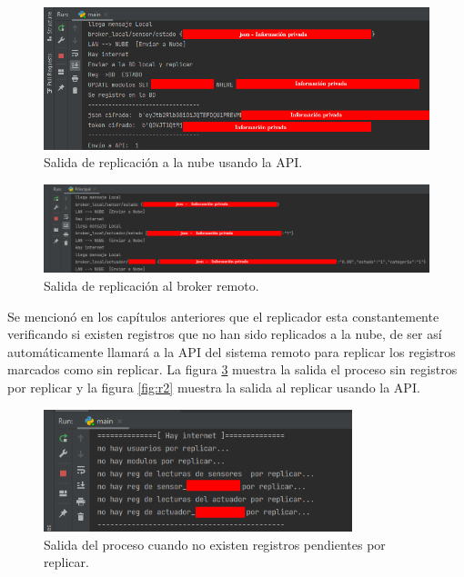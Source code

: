 \begin{figure}[htpb]
\centering 
\includegraphics[width=1.0\textwidth]{./Figures/test/replicador/enviaAPI.png}
\caption{Salida de replicación a la nube usando la API.}
\label{fig:envia1}
\end{figure}

\begin{figure}[htpb]
\centering 
\includegraphics[width=1.0\textwidth]{./Figures/test/replicador/enviabroker.png}
\caption{Salida de replicación al broker remoto.}
\label{fig:envia2}
\end{figure}

Se mencionó en los capítulos anteriores que el replicador esta constantemente verificando si existen registros que no han sido replicados a la nube, de ser así automáticamente llamará a la API del sistema remoto para replicar los registros marcados como sin replicar. La figura \ref{fig:r1} muestra la salida el proceso sin registros por replicar y la figura \ref{fig:r2} muestra la salida al replicar usando la API. 

\begin{figure}[htpb]
\centering 
\includegraphics[width=0.8\textwidth]{./Figures/test/replicador/sinReplicar1.png}
\caption{Salida del proceso cuando no existen registros pendientes por replicar.}
\label{fig:r1}
\end{figure}

